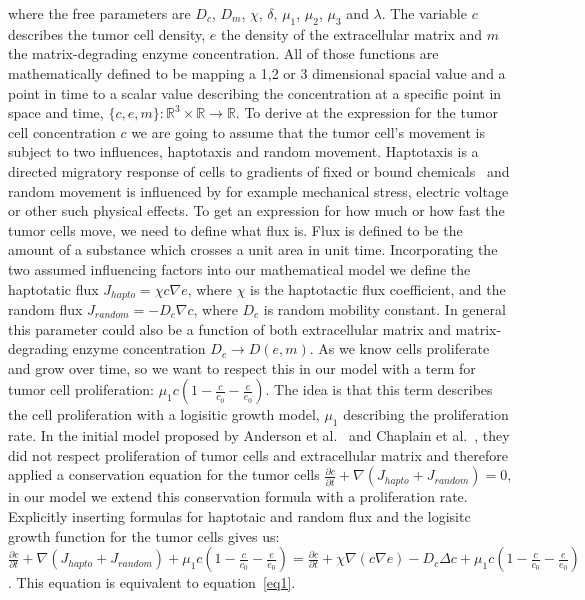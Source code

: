 where the free parameters are $D_c$, $D_m$, $\chi$, $\delta$, $\mu_1$, $\mu_2$, $\mu_3$ and $\lambda$. \newline
The variable $c$ describes the tumor cell density, $e$ the density of the extracellular matrix and $m$ the matrix-degrading enzyme concentration. All of those functions are mathematically defined to be mapping a 1,2 or 3 dimensional spacial value and a point in time to a scalar value describing the concentration at a specific point in space and time, $\{c,e,m\} : \mathbb{R}^{3} \times \mathbb{R} \rightarrow \mathbb{R}$.\newline
To derive at the expression for the tumor cell concentration $c$ we are going to assume that the tumor cell's movement is subject to two influences, haptotaxis and random movement. Haptotaxis is a directed migratory response of cells to gradients of fixed or bound chemicals~\cite{anderson_continuous_1998} and random movement is influenced by for example mechanical stress, electric voltage or other such physical effects. To get an expression for how much or how fast the tumor cells move, we need to define what flux is. Flux is defined to be the amount of a substance  which crosses a unit area in unit time. Incorporating the two assumed influencing factors into our mathematical model we define the haptotatic flux $J_{hapto} = \chi c \nabla e$, where $\chi$ is the haptotactic flux coefficient, and the random flux $J_{random} = -D_c \nabla c$, where $D_c$ is random mobility constant. In general this parameter could also be a function of both extracellular matrix and matrix-degrading enzyme concentration $D_c \rightarrow D(e,m)$. As we know cells proliferate and grow over time, so we want to respect this in our model with a term for tumor cell proliferation: $\mu_1 c (1-\frac{c}{c_0} - \frac{e}{e_0})$. The idea is that this term describes the cell proliferation with a logisitic growth model, $\mu_1$ describing the proliferation rate. In the initial model proposed by Anderson et al.~\cite{anderson_continuous_1998, anderson_mathematical_2000} and Chaplain et al.~\cite{anderson_continuous_1998,chaplain_mathematical_2006,chaplain_mathematical_2006-1,franssen_mathematical_2019}, they did not respect proliferation of tumor cells and extracellular matrix and therefore applied a conservation equation for the tumor cells $\frac{\partial c}{\partial t} + \nabla (J_{hapto} + J_{random}) = 0$, in our model we extend this conservation formula with a proliferation rate. Explicitly inserting formulas for haptotaic and random flux and the logisitc growth function for the tumor cells gives us: $\frac{\partial c}{\partial t} + \nabla (J_{hapto} + J_{random}) + \mu_1 c (1-\frac{c}{c_0} - \frac{e}{e_0}) = \frac{\partial c}{\partial t} + \chi \nabla (c \nabla e) - D_c \Delta c + \mu_1 c (1-\frac{c}{c_0} - \frac{e}{e_0})$. This equation is equivalent to equation~\ref{eq1}.\newline

